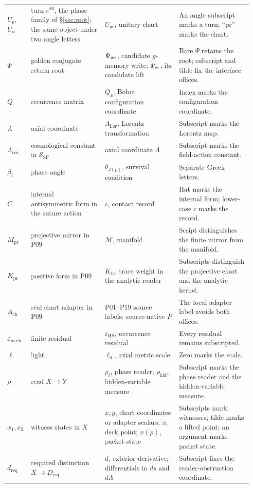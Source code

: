 \documentclass[11pt,a4paper]{article}
\newcommand{\emech}{\varepsilon_{\mathrm{mech}}}\newcommand{\eHS}{\varepsilon_{\mathrm{HS}}}
\newcommand{\Mpr}{M_{\mathrm{pr}}}\newcommand{\Kpr}{K_{\mathrm{pr}}}\newcommand{\Upr}{U_{\mathrm{pr}}}
\newcommand{\Ach}{A_{\mathrm{ch}}}\newcommand{\Zch}{Z_{\mathrm{ch}}}
\theoremstyle{plain}
\theoremstyle{definition}
\theoremstyle{remark}
\begin{document}
{\begin{longtable}{@{}>{\raggedright\arraybackslash}p{1.9cm}>{\raggedright\arraybackslash}p{4.0cm}>{\raggedright\arraybackslash}p{4.9cm}>{\raggedright\arraybackslash}p{4.0cm}@{}}
$U_\theta$, $U_\alpha$ & turn $e^{\theta J}$, the phase family of \S\ref{sec:root}; the same object under two angle letters & $U_{\mathrm{pr}}$, unitary chart & An angle subscript marks a turn; ``pr'' marks the chart.\\
$\Psi$ & golden conjugate return root & $\Psi_{\mathrm{wr}}$, candidate $g$-memory write; $\tilde\Psi_{\mathrm{wr}}$, its candidate lift & Bare $\Psi$ retains the root; subscript and tilde fix the interface offices.\\
$Q$ & recurrence matrix & $Q_k$, Bohm configuration coordinate & Index marks the configuration coordinate.\\
$\Lambda$ & axial coordinate & $\Lambda_{\mathrm{Lor}}$, Lorentz transformation & Subscript marks the Lorentz map.\\
$\Lambda_{\mathrm{cos}}$ & cosmological constant in $\mathcal S_{\mathrm{SF}}$ & axial coordinate $\Lambda$ & Subscript marks the field-action constant.\\
$\beta_t$ & phase angle & $\theta_{J(p)}$, survival condition & Separate Greek letters.\\
$\hat C$ & internal antisymmetric form in the suture action & $c$, contact record & Hat marks the internal form; lower-case $c$ marks the record.\\
$\Mpr$ & projective mirror in P09 & $\mathcal M$, manifold & Script distinguishes the finite mirror from the manifold.\\
$\Kpr$ & positive form in P09 & $K_{\mathrm{tr}}$, trace weight in the analytic reader & Subscripts distinguish the projective chart and the analytic kernel.\\
$\Ach$ & real chart adapter in P09 & P01--P19 source labels; source-native $P$ & The local adapter label avoids both offices.\\
$\emech$ & finite residual & $\eHS$, occurrence residual & Every residual remains subscripted.\\
$\ell$ & light & $\ell_0$, axial metric scale & Zero marks the scale.\\
$\rho$ & read $X\to Y$ & $\rho_t$, phase reader; $\rho_{\mathrm{hid}}$, hidden-variable measure & Subscript marks the phase reader and the hidden-variable measure.\\
$x_1,x_2$ & witness states in $X$ & $x,y$, chart coordinates or adapter scalars; $\tilde x$, deck point; $x(p)$, packet state & Subscripts mark witnesses; tilde marks a lifted point; an argument marks packet state.\\
$d_{\mathrm{req}}$ & required distinction $X\to D_{\mathrm{req}}$ & $d$, exterior derivative; differentials in $ds$ and $d\Lambda$ & Subscript fixes the reader-obstruction coordinate.\\

\end{longtable}}
\end{document}
